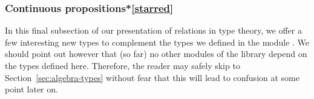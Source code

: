 






\subsubsection{Continuous propositions*\protect\cref{starred}}\label{sec:cont-prop-types}
In this final subsection of our presentation of relations in type theory, we offer a few interesting new types to complement the types we defined in the module .  We should point out however that (so far) no other modules of the library depend on the types defined here. Therefore, the reader may safely skip to Section~\ref{sec:algebra-types} without fear that this will lead to confusion at some point later on.

